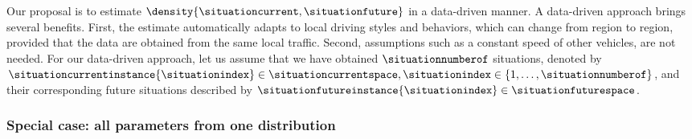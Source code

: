 Our proposal is to estimate $\density{\situationcurrent, \situationfuture}$ in a data-driven manner. 
A data-driven approach brings several benefits.
First, the estimate automatically adapts to local driving styles and behaviors, which can change from region to region, provided that the data are obtained from the same local traffic.
Second, assumptions such as a constant speed of other vehicles, are not needed.
For our data-driven approach, let us assume that we have obtained $\situationnumberof$ situations, denoted by $\situationcurrentinstance{\situationindex}\in\situationcurrentspace, \situationindex\in\{1,\ldots,\situationnumberof\}$, and their corresponding future situations described by $\situationfutureinstance{\situationindex}\in\situationfuturespace$.



\subsubsection{Special case: all parameters from one distribution}
\label{sec:one kde}


